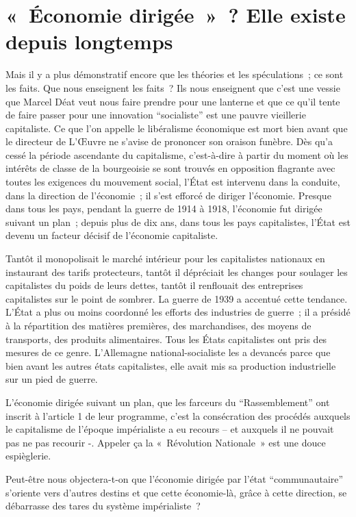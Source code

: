 \documentclass[french,twoside]{book} %
\begin{document}
\section[{« Économie dirigée » ? Elle existe depuis longtemps}]{« Économie dirigée » ? Elle existe depuis longtemps}
\noindent Mais il y a plus démonstratif encore que les théories et les spéculations ; ce sont les faits. Que nous enseignent les faits ? Ils nous enseignent que c’est une vessie que Marcel Déat veut nous faire prendre pour une lanterne et que ce qu’il tente de faire passer pour une innovation “socialiste” est une pauvre vieillerie capitaliste. Ce que l’on appelle le libéralisme économique est mort bien avant que le directeur de L’Œuvre ne s’avise de prononcer son oraison funèbre. Dès qu’a cessé la période ascendante du capitalisme, c’est-à-dire à partir du moment où les intérêts de classe de la bourgeoisie se sont trouvés en opposition flagrante avec toutes les exigences du mouvement social, l’État est intervenu dans la conduite, dans la direction de l’économie ; il s’est efforcé de diriger l’économie. Presque dans tous les pays, pendant la guerre de 1914 à 1918, l’économie fut dirigée suivant un plan ; depuis plus de dix ans, dans tous les pays capitalistes, l’État est devenu un facteur décisif de l’économie capitaliste.\par
Tantôt il monopolisait le marché intérieur pour les capitalistes nationaux en instaurant des tarifs protecteurs, tantôt il dépréciait les changes pour soulager les capitalistes du poids de leurs dettes, tantôt il renflouait des entreprises capitalistes sur le point de sombrer. La guerre de 1939 a accentué cette tendance. L’État a plus ou moins coordonné les efforts des industries de guerre ; il a présidé à la répartition des matières premières, des marchandises, des moyens de transports, des produits alimentaires. Tous les États capitalistes ont pris des mesures de ce genre. L’Allemagne national-socialiste les a devancés parce que bien avant les autres états capitalistes, elle avait mis sa production industrielle sur un pied de guerre.\par
L’économie dirigée suivant un plan, que les farceurs du “Rassemblement” ont inscrit à l’article 1 de leur programme, c’est la consécration des procédés auxquels le capitalisme de l’époque impérialiste a eu recours – et auxquels il ne pouvait pas ne pas recourir -. Appeler ça la « Révolution Nationale » est une douce espièglerie.\par
Peut-être nous objectera-t-on que l’économie dirigée par l’état “communautaire” s’oriente vers d’autres destins et que cette économie-là, grâce à cette direction, se débarrasse des tares du système impérialiste ?\par
\end{document}
